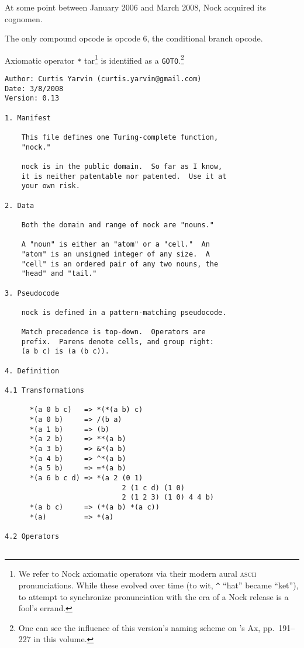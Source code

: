 \documentclass[twoside]{article}
\begin{document}
At some point between January 2006 and March 2008, Nock acquired its cognomen.

The only compound opcode is opcode 6, the conditional branch opcode.

Axiomatic operator \texttt{*} tar\footnote{We refer to Nock axiomatic operators via their modern aural \textsc{ascii} pronunciations.  While these evolved over time (to wit, \texttt{\textasciicircum} ``hat'' became ``ket''), to attempt to synchronize pronunciation with the era of a Nock release is a fool's errand.} is identified as a \texttt{GOTO}.\footnote{One can see the influence of this version's naming scheme on 's Ax, pp.~191–227 in this volume.}
 
\begin{lstlisting}[label=lst:nock13k,caption={Nock 13K, 8 March 2008.},style=listingcode]
Author: Curtis Yarvin (curtis.yarvin@gmail.com)
Date: 3/8/2008
Version: 0.13

1. Manifest

    This file defines one Turing-complete function,
    "nock."

    nock is in the public domain.  So far as I know,
    it is neither patentable nor patented.  Use it at
    your own risk.

2. Data

    Both the domain and range of nock are "nouns."

    A "noun" is either an "atom" or a "cell."  An
    "atom" is an unsigned integer of any size.  A
    "cell" is an ordered pair of any two nouns, the
    "head" and "tail."

3. Pseudocode

    nock is defined in a pattern-matching pseudocode.

    Match precedence is top-down.  Operators are
    prefix.  Parens denote cells, and group right:
    (a b c) is (a (b c)).

4. Definition

4.1 Transformations

      *(a 0 b c)   => *(*(a b) c)
      *(a 0 b)     => /(b a)
      *(a 1 b)     => (b)
      *(a 2 b)     => **(a b)
      *(a 3 b)     => &*(a b)
      *(a 4 b)     => ^*(a b)
      *(a 5 b)     => =*(a b)
      *(a 6 b c d) => *(a 2 (0 1)
                            2 (1 c d) (1 0)
                            2 (1 2 3) (1 0) 4 4 b)
      *(a b c)     => (*(a b) *(a c))
      *(a)         => *(a)

4.2 Operators


\end{lstlisting}
\end{document}
